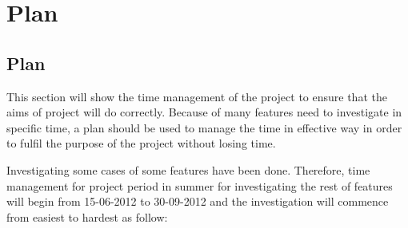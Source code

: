 \documentclass[11pt]{report}
\begin{document}
\chapter{Plan}
\section{Plan}
\label{section: plan}

This section will show the time management of the project to ensure that the aims of project will do correctly.  Because of many features need to investigate in specific time, a plan should be used to manage the time in effective way in order to fulfil the purpose of the project without losing time.

Investigating some cases of some features have been done. Therefore, time management for project period in summer for investigating the rest of features will begin from 15-06-2012 to 30-09-2012 and the investigation will commence from easiest to hardest as follow:
\end{document}
